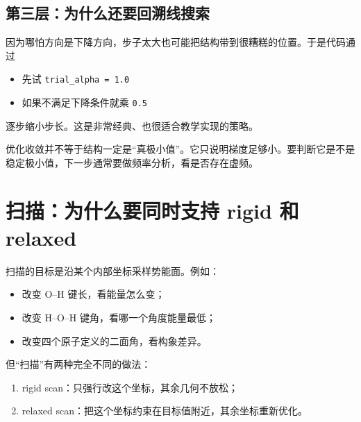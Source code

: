 \documentclass[UTF8,11pt,fontset=fandol]{ctexbook}
\begin{document}
\subsection*{第三层：为什么还要回溯线搜索}

因为哪怕方向是下降方向，步子太大也可能把结构带到很糟糕的位置。于是代码通过
\begin{itemize}
  \item 先试 \texttt{trial\_alpha = 1.0}
  \item 如果不满足下降条件就乘 \texttt{0.5}
\end{itemize}
逐步缩小步长。这是非常经典、也很适合教学实现的策略。

\begin{warnbox}[优化里最容易忽略的事]
优化收敛并不等于结构一定是“真极小值”。它只说明梯度足够小。要判断它是不是稳定极小值，下一步通常要做频率分析，看是否存在虚频。
\end{warnbox}

\section{扫描：为什么要同时支持 rigid 和 relaxed}

扫描的目标是沿某个内部坐标采样势能面。例如：
\begin{itemize}
  \item 改变 O--H 键长，看能量怎么变；
  \item 改变 H--O--H 键角，看哪一个角度能量最低；
  \item 改变四个原子定义的二面角，看构象差异。
\end{itemize}

但“扫描”有两种完全不同的做法：
\begin{enumerate}[label=\arabic*.]
  \item rigid scan：只强行改这个坐标，其余几何不放松；
  \item relaxed scan：把这个坐标约束在目标值附近，其余坐标重新优化。
\end{enumerate}
\end{document}
